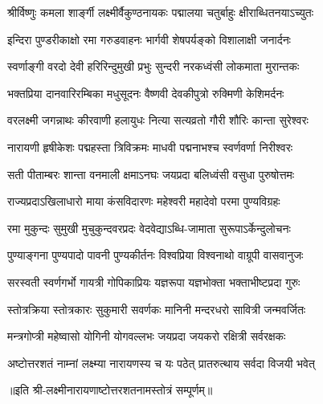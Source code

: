 
\twolineshloka
{श्रीर्विष्णुः कमला शार्ङ्गी लक्ष्मीर्वैकुण्ठनायकः}
{पद्मालया चतुर्बाहुः क्षीराब्धितनयाऽच्युतः}%

\twolineshloka
{इन्दिरा पुण्डरीकाक्षो रमा गरुडवाहनः}
{भार्गवी शेषपर्यङ्को विशालाक्षी जनार्दनः}%

\twolineshloka
{स्वर्णाङ्गी वरदो देवी हरिरिन्दुमुखी प्रभुः}
{सुन्दरी नरकध्वंसी लोकमाता मुरान्तकः}%

\twolineshloka
{भक्तप्रिया दानवारिरम्बिका मधुसूदनः}
{वैष्णवी देवकीपुत्रो रुक्मिणी केशिमर्दनः}%

\twolineshloka
{वरलक्ष्मी जगन्नाथः कीरवाणी हलायुधः}
{नित्या सत्यव्रतो गौरी शौरिः कान्ता सुरेश्वरः}

\twolineshloka
{नारायणी हृषीकेशः पद्महस्ता त्रिविक्रमः}
{माधवी पद्मनाभश्च स्वर्णवर्णा निरीश्वरः}

\twolineshloka
{सती पीताम्बरः शान्ता वनमाली क्षमाऽनघः}
{जयप्रदा बलिध्वंसी वसुधा पुरुषोत्तमः}

\twolineshloka
{राज्यप्रदाऽखिलाधारो माया कंसविदारणः}
{महेश्वरी महादेवो परमा पुण्यविग्रहः}


\twolineshloka
{रमा मुकुन्दः सुमुखी मुचुकुन्दवरप्रदः}
{वेदवेद्याऽब्धि-जामाता सुरूपाऽर्केन्दुलोचनः}

\twolineshloka
{पुण्याङ्गना पुण्यपादो पावनी पुण्यकीर्तनः}
{विश्वप्रिया विश्वनाथो वाग्रूपी वासवानुजः}

\twolineshloka
{सरस्वती स्वर्णगर्भो गायत्री गोपिकाप्रियः}
{यज्ञरूपा यज्ञभोक्ता भक्ताभीष्टप्रदा गुरुः}

\twolineshloka
{स्तोत्रक्रिया स्तोत्रकारः सुकुमारी सवर्णकः}
{मानिनी मन्दरधरो सावित्री जन्मवर्जितः}

\twolineshloka
{मन्त्रगोप्त्री महेष्वासो योगिनी योगवल्लभः}
{जयप्रदा जयकरो रक्षित्री सर्वरक्षकः}

\twolineshloka
{अष्टोत्तरशतं नाम्नां लक्ष्म्या नारायणस्य च}
{यः पठेत् प्रातरुत्थाय सर्वदा विजयी भवेत्}

॥इति श्री-लक्ष्मीनारायणाष्टोत्तरशतनामस्तोत्रं सम्पूर्णम्॥